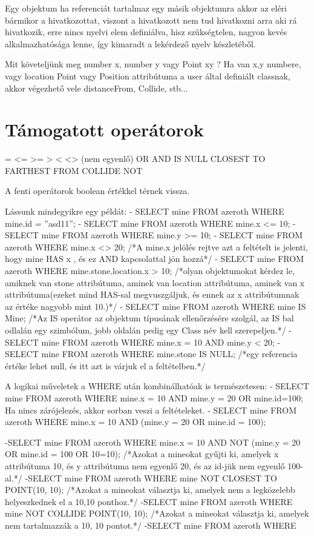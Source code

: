 Egy objektum ha referenciát tartalmaz egy másik objektumra akkor az eléri bármikor a hivatkozottat, viszont a hivatkozott nem tud hivatkozni arra aki rá hivatkozik, erre nincs nyelvi elem definiálva, hisz szükségtelen, nagyon kevés alkalmazhatósága lenne, így kimaradt a lekérdező nyelv készletéből.

Mit követeljünk meg number x, number y vagy Point xy ?
Ha van x,y numbere, vagy location Point vagy Position attribútuma a user által definiált classnak, akkor végezhető vele distanceFrom, Collide, stb...

\section{Támogatott operátorok}

= 
<= 
>= 
> 
< 
<> (nem egyenlő) 
OR 
AND 
IS 
NULL
CLOSEST TO
FARTHEST FROM
COLLIDE
NOT

A fenti operátorok boolean értékkel térnek vissza.

Lássunk mindegyikre egy példát:
- SELECT mine FROM azeroth WHERE mine.id = ”asd11”;
- SELECT mine FROM azeroth WHERE mine.x <= 10;
- SELECT mine FROM azeroth WHERE mine.y >= 10;
- SELECT mine FROM azeroth WHERE mine.x <> 20; /*A mine.x jelölés rejtve azt a feltételt is jelenti, hogy mine HAS x , és ez AND kapcsolattal jön hozzá*/
- SELECT mine FROM azeroth WHERE mine.stone.location.x > 10; /*olyan objektumokat kérdez le, amiknek van stone attribútuma, aminek van location attribútuma, aminek van x attribútuma(ezeket mind HAS-sal megvuszgáljuk, és ennek az x attribútumnak az értéke nagyobb mint 10.)*/
- SELECT mine FROM azeroth WHERE mine IS Mine; /*Az IS operátor az objektum típusának ellenőrzésére szolgál, az IS bal odlalán egy szimbólum, jobb oldalán pedig egy Class név kell szerepeljen.*/
- SELECT mine FROM azeroth WHERE mine.x = 10 AND mine.y < 20;
- SELECT mine FROM azeroth WHERE mine.stone IS NULL;  /*egy referencia értéke lehet null, és itt azt is várjuk el a feltételben.*/

A logikai műveletek a WHERE után kombinálhatóak is természetesen:
- SELECT mine FROM azeroth WHERE mine.x = 10 AND mine.y = 20 OR mine.id=100;
Ha nincs zárójelezés, akkor sorban veszi a feltételeket.
- SELECT mine FROM azeroth WHERE mine.x = 10 AND (mine.y = 20 OR mine.id = 100);

-SELECT mine FROM azeroth WHERE mine.x = 10 AND NOT (mine.y = 20 OR mine.id = 100 OR 10=10);  /*Azokat a mineokat gyűjti ki, amelyek x attribútuma 10, és y attribútuma nem egyenlő 20, és az id-jük nem egyenlő 100-al.*/
-SELECT mine FROM azeroth WHERE mine NOT CLOSEST TO POINT(10, 10); /*Azokat a mineokat választja ki, amelyek nem a legközelebb helyeszkednek el a 10,10 ponthoz.*/
-SELECT mine FROM azeroth WHERE mine NOT COLLIDE POINT(10, 10);
/*Azokat a mineokat választja ki, amelyek nem tartalmazzák a 10, 10 pontot.*/
-SELECT mine FROM azeroth WHERE 

